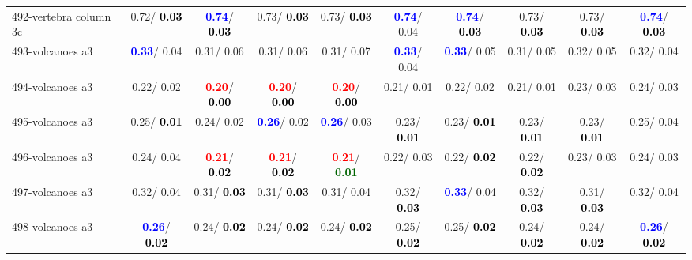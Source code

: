 \begin{table}[h]
\begin{center}
{\begin{tabular}{lc|c|c|c|c|c|c|c|c}
492-vertebra column 3c &   0.72/\textcolor{black}{\textbf{  0.03}} & \textcolor{blue}{\textbf{  0.74}}/\textcolor{black}{\textbf{  0.03}} &   0.73/\textcolor{black}{\textbf{  0.03}} &   0.73/\textcolor{black}{\textbf{  0.03}} & \textcolor{blue}{\textbf{  0.74}}/  0.04 & \textcolor{blue}{\textbf{  0.74}}/\textcolor{black}{\textbf{  0.03}} &   0.73/\textcolor{black}{\textbf{  0.03}} &   0.73/\textcolor{black}{\textbf{  0.03}} & \textcolor{blue}{\textbf{  0.74}}/\textcolor{black}{\textbf{  0.03}} \\
493-volcanoes a3 & \textcolor{blue}{\textbf{  0.33}}/  0.04 &   0.31/  0.06 &   0.31/  0.06 &   0.31/  0.07 & \textcolor{blue}{\textbf{  0.33}}/  0.04 & \textcolor{blue}{\textbf{  0.33}}/  0.05 &   0.31/  0.05 &   0.32/  0.05 &   0.32/  0.04 \\
494-volcanoes a3 &   0.22/  0.02 & \textcolor{red}{\textbf{  0.20}}/\textcolor{black}{\textbf{  0.00}} & \textcolor{red}{\textbf{  0.20}}/\textcolor{black}{\textbf{  0.00}} & \textcolor{red}{\textbf{  0.20}}/\textcolor{black}{\textbf{  0.00}} &   0.21/  0.01 &   0.22/  0.02 &   0.21/  0.01 &   0.23/  0.03 &   0.24/  0.03 \\ \hline
495-volcanoes a3 &   0.25/\textcolor{black}{\textbf{  0.01}} &   0.24/  0.02 & \textcolor{blue}{\textbf{  0.26}}/  0.02 & \textcolor{blue}{\textbf{  0.26}}/  0.03 &   0.23/\textcolor{black}{\textbf{  0.01}} &   0.23/\textcolor{black}{\textbf{  0.01}} &   0.23/\textcolor{black}{\textbf{  0.01}} &   0.23/\textcolor{black}{\textbf{  0.01}} &   0.25/  0.04 \\
496-volcanoes a3 &   0.24/  0.04 & \textcolor{red}{\textbf{  0.21}}/\textcolor{black}{\textbf{  0.02}} & \textcolor{red}{\textbf{  0.21}}/\textcolor{black}{\textbf{  0.02}} & \textcolor{red}{\textbf{  0.21}}/\textcolor{darkgreen}{\textbf{  0.01}} &   0.22/  0.03 &   0.22/\textcolor{black}{\textbf{  0.02}} &   0.22/\textcolor{black}{\textbf{  0.02}} &   0.23/  0.03 &   0.24/  0.03 \\
497-volcanoes a3 &   0.32/  0.04 &   0.31/\textcolor{black}{\textbf{  0.03}} &   0.31/\textcolor{black}{\textbf{  0.03}} &   0.31/  0.04 &   0.32/\textcolor{black}{\textbf{  0.03}} & \textcolor{blue}{\textbf{  0.33}}/  0.04 &   0.32/\textcolor{black}{\textbf{  0.03}} &   0.31/\textcolor{black}{\textbf{  0.03}} &   0.32/  0.04 \\
498-volcanoes a3 & \textcolor{blue}{\textbf{  0.26}}/\textcolor{black}{\textbf{  0.02}} &   0.24/\textcolor{black}{\textbf{  0.02}} &   0.24/\textcolor{black}{\textbf{  0.02}} &   0.24/\textcolor{black}{\textbf{  0.02}} &   0.25/\textcolor{black}{\textbf{  0.02}} &   0.25/\textcolor{black}{\textbf{  0.02}} &   0.24/\textcolor{black}{\textbf{  0.02}} &   0.24/\textcolor{black}{\textbf{  0.02}} & \textcolor{blue}{\textbf{  0.26}}/\textcolor{black}{\textbf{  0.02}} \\

\end{tabular}}
\end{center}
\end{table}
